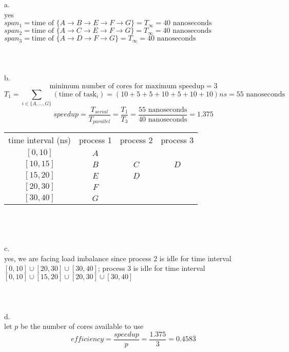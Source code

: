 \documentclass[12pt,border=4pt,multi]{article}%
\begin{document}
a.\\
yes\\
$span_1 = \text{time of }\{A \rightarrow B \rightarrow E \rightarrow F \rightarrow G\}= T_{\infty} = 40\text{ nanoseconds}$\\
$span_2 = \text{time of }\{A \rightarrow C \rightarrow E \rightarrow F \rightarrow G\}= T_{\infty} = 40\text{ nanoseconds}$\\
$span_3 = \text{time of }\{A \rightarrow D \rightarrow F \rightarrow G\} = T_{\infty} = 40 \text{ nanoseconds}$\\
\\
\\
\\
b.\\
\[\text{minimum number of cores for maximum speedup} = 3\]
\[T_1 = \sum_{i \in \{A, ..., G\}} (\text{time of task}_i) = (10 + 5 + 5 + 10 + 5 + 10 + 10)ns = 55\text{ nanoseconds}\]
\[speedup = \frac{T_{serial}}{T_{parallel}} = \frac{T_1}{T_3} = \frac{55 \text{ nanoseconds}}{40 \text{ nanoseconds}} = 1.375\]
\begin{center}
\begin{tabular}{cccc}
 time interval (ns) & process 1 & process 2 & process 3\\
 $[0, 10]$ & $A$ & &\\
 $[10, 15]$ & $B$ & $C$ & $D$\\
 $[15, 20]$ & $E$ & $D$ &\\
 $[20, 30]$ & $F$ & &\\
 $[30, 40]$ & $G$ & &\\
\end{tabular}
\end{center}
\leavevmode
\\
\\
\\
c.\\
yes, we are facing load imbalance since process 2 is idle for time interval $[0, 10] \cup [20, 30] \cup [30, 40]$; process 3 is idle for time interval $[0, 10] \cup [15, 20] \cup [20, 30] \cup [30, 40]$\\
\\
\\
\\
d.\\
let $p$ be the number of cores available to use\\
\[efficiency = \frac{speedup}{p} = \frac{1.375}{3} = 0.458\overline{3}\]
\\
\\
\\
\end{document}
